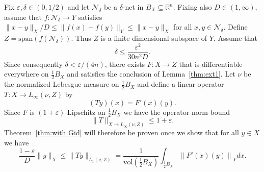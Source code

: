 \documentclass[12pt,reqno]{amsart}
\theoremstyle{plain}
\theoremstyle{definition}
\newcommand{\e}{\varepsilon}
\renewcommand{\d}{\delta}
\renewcommand{\le}{\leqslant}
\newcommand{\R}{\mathbb R}
\newcommand{\vol}{\mathrm{vol}}
\begin{document}
Fix $\e,\d\in (0,1/2)$ and let $\mathcal{N}_\d$ be a $\d$-net  in $B_X\subseteq \R^n$. Fixing also $D\in (1,\infty)$, assume that $f:\mathcal{N}_\d\to Y$ satisfies $\|x-y\|_X/D\le \|f(x)-f(y)\|_Y\le \|x-y\|_X$ for all $x,y\in \mathcal{N}_\d$. Define $Z=\mathrm{span}\left(f(\mathcal{N}_\d)\right)$. Thus $Z$ is a finite dimensional subspace of $Y$. Assume that
\begin{equation}\label{eq:delta assumption L_p(Z)}
\d\le \frac{\e^2}{30n^2D}.
\end{equation}
Since consequently $\d<\e/(4n)$, there exists $F:X\to Z$ that is differentiable everywhere on $\frac12B_X$ and satisfies the conclusion of Lemma~\ref{thm:ext1}. Let $\nu$ be the normalized Lebesgue measure on $\frac12 B_X$ and define a linear operator $T:X\to L_\infty(\nu,Z)$ by
\begin{equation}\label{eq:def T}
(Ty)(x)=F'(x)(y).
\end{equation}
Since $F$ is $(1+\e)$-Lipschitz on $\frac12 B_X$ we have the operator norm bound
\begin{equation*}\label{eq:T norm}
\|T\|_{X\to L_\infty(\nu,Z)}\le 1+\e.
\end{equation*}
Theorem~\ref{thm:with Gid} will therefore be proven once we show that for all $y\in X$ we have
\begin{equation}\label{eq:T goal}
\frac{1-\e}{D}\|y\|_X\le \|T y\|_{L_1(\nu,Z)}= \frac{1}{\vol\left(\frac12 B_X\right)}\int_{\frac12 B_X}\left\|F'(x)(y)\right\|_Ydx.
\end{equation}
\end{document}
